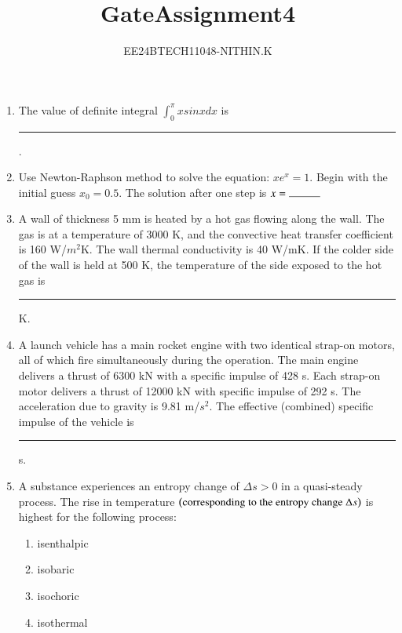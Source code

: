\documentclass[journal]{IEEEtran}
\numberwithin{equation}{enumi}
\numberwithin{figure}{enumi}
\begin{document}


\title{GateAssignment4}
\author{EE24BTECH11048-NITHIN.K} 
{\let\newpage\relax\maketitle}
\begin{enumerate}
\section{Q.26 to Q.55 carry two marks each}

\item The value of definite integral $\int_{0}^{\pi}xsinxdx$ is \rule{1cm}{0.4pt}.
\item Use Newton-Raphson method to solve the equation: $xe^x = 1$. Begin with the initial guess $x_0 = 0.5$. The solution after one step is $x = \rule{1cm}{0.4pt}$
\item A wall of thickness 5 mm is heated by a hot gas flowing along the wall. The gas is at a temperature of 3000 K, and the convective heat transfer coefficient is 160 W/$m^2$K. The wall thermal conductivity is 40 W/mK. If the colder side of the wall is held at 500 K, the temperature of the side exposed to the hot gas is \rule{1cm}{0.4pt} K.
\item A launch vehicle has a main rocket engine with two identical strap-on motors, all of which fire simultaneously during the operation. The main engine delivers a thrust of 6300 kN with a specific impulse of 428 s. Each strap-on motor delivers a thrust of 12000 kN with specific impulse of 292 s. The acceleration due to gravity is 9.81 m/$s^2$. The effective (combined) specific impulse of the vehicle is \rule{1cm}{0.4pt} s.
\item A substance experiences an entropy change of $\Delta s > 0$ in a quasi-steady process. The rise in temperature $\left(\text{corresponding to the entropy change }\Delta s\right)$ is highest for the following process:
\begin{enumerate}
\item isenthalpic
\item isobaric
\item isochoric
\item isothermal
\end{enumerate}

\end{enumerate}
\end{document}
